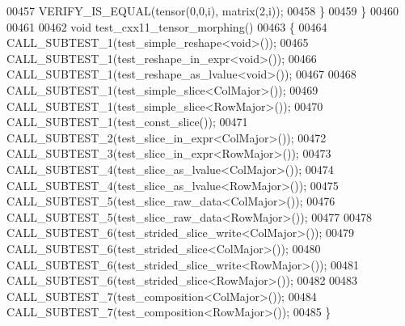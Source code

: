 \begin{DoxyCode}
00457     VERIFY\_IS\_EQUAL(tensor(0,0,i), matrix(2,i));
00458   \}
00459 \}
00460 
00461 
00462 \textcolor{keywordtype}{void} test\_cxx11\_tensor\_morphing()
00463 \{
00464   CALL\_SUBTEST\_1(test\_simple\_reshape<void>());
00465   CALL\_SUBTEST\_1(test\_reshape\_in\_expr<void>());
00466   CALL\_SUBTEST\_1(test\_reshape\_as\_lvalue<void>());
00467 
00468   CALL\_SUBTEST\_1(test\_simple\_slice<ColMajor>());
00469   CALL\_SUBTEST\_1(test\_simple\_slice<RowMajor>());
00470   CALL\_SUBTEST\_1(test\_const\_slice());
00471   CALL\_SUBTEST\_2(test\_slice\_in\_expr<ColMajor>());
00472   CALL\_SUBTEST\_3(test\_slice\_in\_expr<RowMajor>());
00473   CALL\_SUBTEST\_4(test\_slice\_as\_lvalue<ColMajor>());
00474   CALL\_SUBTEST\_4(test\_slice\_as\_lvalue<RowMajor>());
00475   CALL\_SUBTEST\_5(test\_slice\_raw\_data<ColMajor>());
00476   CALL\_SUBTEST\_5(test\_slice\_raw\_data<RowMajor>());
00477 
00478   CALL\_SUBTEST\_6(test\_strided\_slice\_write<ColMajor>());
00479   CALL\_SUBTEST\_6(test\_strided\_slice<ColMajor>());
00480   CALL\_SUBTEST\_6(test\_strided\_slice\_write<RowMajor>());
00481   CALL\_SUBTEST\_6(test\_strided\_slice<RowMajor>());
00482 
00483   CALL\_SUBTEST\_7(test\_composition<ColMajor>());
00484   CALL\_SUBTEST\_7(test\_composition<RowMajor>());
00485 \}
\end{DoxyCode}
